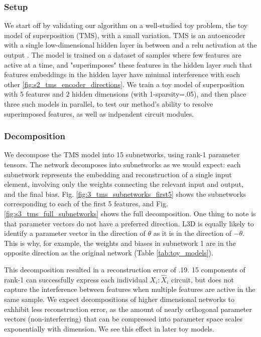 \documentclass{article}
\theoremstyle{plain}
\theoremstyle{definition}
\theoremstyle{remark}
\begin{document}
\subsubsection{Setup}

We start off by validating our algorithm on a well-studied toy problem, the toy model of superposition (TMS), with a small variation. TMS is an autoencoder with a single low-dimensional hidden layer in between and a relu activation at the output \cite{elhage2022toy}. The model is trained on a dataset of samples where few features are active at a time, and "superimposes" these features in the hidden layer such that features embeddings in the hidden layer have minimal interference with each other \ref{fig:s2_tms_encoder_directions}. We train a toy model of superposition with 5 features and 2 hidden dimensions (with 1-sparsity=.05), and then place three such models in parallel, to test our method's ability to resolve superimposed features, as well as indpendent circuit modules.


\subsubsection{Decomposition}
We decompose the TMS model into 15 subnetworks, using rank-1 parameter tensors. The network decomposes into subnetworks as we would expect: each subnetwork represents the embedding and reconstruction of a single input element, involving only the weights connecting the relevant input and output, and the final bias. Fig. \ref{fig:3_tms_subnetworks_first5} shows the subnetworks corresponding to each of the first 5 features, and Fig. \ref{fig:s3_tms_full_subnetworks} shows the full decomposition. One thing to note is that parameter vectors do not have a preferred direction. L3D is equally likely to identify a parameter vector in the direction of $\theta$ as it is in the direction of $-\theta$. This is why, for example, the weights and biases in subnetwork 1 are in the opposite direction as the original network (Table \ref{tab:toy_models}).

This decomposition resulted in a reconstruction error of .19. 15 components of rank-1 can successfully express each individual $X_i:\hat{X}_i$ circuit, but does not capture the interference between features when multiple features are active in the same sample. We expect decompositions of higher dimensional networks to exhhibit less reconstruction error, as the amount of nearly orthogonal parameter vectors (non-interferring) that can be compressed into parameter space scales exponentially with dimension. We see this effect in later toy models. 
\end{document}
